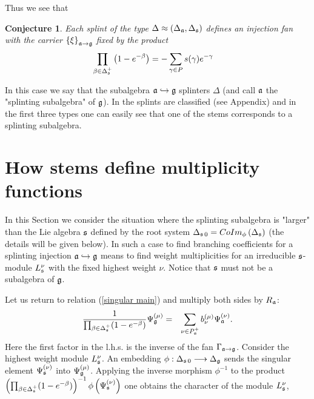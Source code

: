 \documentclass[12pt]{article}
\newtheorem{Cnj}[Def]{Conjecture}
\begin{document}
Thus we see that
\begin{Cnj}
Each splint of the type $\Delta \approx (\Delta_{\frak{a}},\Delta_{\frak{s}})$ defines an injection fan with the carrier $\left\{ \xi \right\} _{\frak{a}\rightarrow \frak{g}}$ fixed by the product
\begin{equation}
\prod_{\beta \in  \Delta _{\frak{s}}^{+}}\left( 1-e^{
-\beta }\right) =-\sum_{\gamma \in P} s(\gamma )e^{-\gamma }\quad
\label{splint product}
\end{equation}
\end{Cnj}
In this case we say that the subalgebra $\frak{a}\hookrightarrow\frak{g}$ splinters $\Delta$ (and call $\frak{a}$ the "splinting subalgebra" of $\frak{g}$). In
\cite{richter2008splints} the splints are classified (see Appendix) and in the first three types one can easily see that one of the stems corresponds to a splinting subalgebra.

\section{How stems define multiplicity functions}
\label{sec:stems and multiplicity functions}

In this Section we consider the situation where  the splinting subalgebra is "larger"
than the Lie algebra $\frak{s}$ defined by the root system $\Delta_{\frak{s}\,0}=CoIm_{\phi} \left( \Delta_{\frak{s}}\right)$
(the details will be given below). In such a case to find branching coefficients for a splinting 
injection $\frak{a}\hookrightarrow\frak{g}$ means to find weight multiplicities for an irreducible $\frak{s}$-module $L^{\nu}_{\frak{s}}$ with 
the fixed highest weight $\nu$. Notice that $\frak{s}$ must not be a subalgebra of $\frak{g}$.

Let us return to relation (\ref{singular main}) and multiply both sides by $R_{\frak{a}}$: 
\begin{eqnarray}
 \frac{1}{\prod_{\beta \in \Delta_{\frak{s}} ^{+}}(1-e^{-\beta })}\Psi_{\frak{g}} ^{\left( \mu \right) }
&=&
\sum_{\nu \in P_{\frak{a}}^{+}}b_{\nu }^{(\mu )}\Psi _{\frak{a}%
}^{\left( \nu \right) }.
\label{singular main-2}
\end{eqnarray}
Here the first factor in the l.h.s. is the inverse of the fan $\Gamma _{\frak{a}%
\rightarrow \frak{g}}$. 
Consider the highest weight module $L^{\nu}_{\frak{s}}$. An embedding
$\phi:\Delta_{\frak{s}\,0} \longrightarrow \Delta_{\frak{g}} $  sends the singular element         $\Psi_{\frak{s}} ^{\left( \nu \right)}$ into $ \Psi_{\frak{g}} ^{\left( \mu \right) }$.
Applying the inverse morphism $\phi^{-1}$ to the product 
$\left(\prod_{\beta \in \Delta_{\frak{s}} ^{+}}(1-e^{-\beta })\right)^{-1}\phi\left(\Psi_{\frak{s}} ^{\left( \nu \right)}\right)$  
 one obtains the character of the module $L^{\nu}_{\frak{s}}$,
\end{document}

